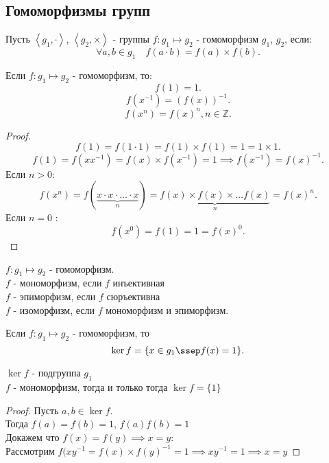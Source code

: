 \documentclass[11pt, oneside]{article}   	%
\begin{document}
    \subsection{Гомоморфизмы групп}
        \begin{definition}
            Пусть $\left<g_1, \cdot \right>$, $\left<g_2, \times \right>$ - группы
            $f: g_1 \mapsto g_2$ - гомоморфизм $g_1$, $g_2$, если:
            \[ \forall{a, b\in g_1}\quad f(a\cdot b) = f(a) \times  f(b) .\]
        \end{definition}
        \begin{dlemma}
            Если $f: g_1 \mapsto g_2$ - гомоморфизм, то:
            \[ f(1) = 1 .\]
            \[ f(x^{-1}) = (f(x))^{-1} .\]
            \[ f(x^{n}) = f(x)^{n}, n\in \mathbb{Z} .\]
            \begin{proof}
                \[ f(1) = f(1\cdot 1) = f(1) \times  f(1) = 1 = 1 \times  1 .\]
                \[ f(1) = f(x x^{-1}) = f(x)\times f(x^{-1}) = 1 \implies f(x^{-1}) = f(x)^{-1}  .\]
                Если $n>0$:
                \[ f(x^{n}) = f(\underbrace{x\cdot x\cdot \ldots \cdot x}_n) = \underbrace{f(x)\times f(x) \times  \ldots f(x)}_n = f(x)^{n} .\]
                Если $n=0$ :
                \[ f(x^{0}) = f(1) = 1 = f(x)^{0} .\] 
            \end{proof}
        \end{dlemma}
        \begin{definition}
             $f: g_1 \mapsto g_2$ - гомоморфизм.\\
             $f$ - мономорфизм, если  $f$ инъективная\\
             $f$ - эпиморфизм, если $f$ сюръективна\\
             $f$ - изоморфизм, если $f$ мономорфизм и эпиморфизм.
        \end{definition}
        \begin{definition}
            Если $f: g_1 \mapsto g_2$ - гомоморфизм, то 
            \[ \ker f = \{x\in g_1\ssep f(x) = 1\}  .\] 
        \end{definition}
        \begin{theorem}
            $\ker f$ - подгруппа $g_1$\\
            $f$ - мономорфизм, тогда и только тогда $\ker f = \{1\} $ 
            \begin{proof}
                Пусть $a, b\in \ker f$.\\
                Тогда $f(a) = f(b) = 1$,  $f(a)f(b) = 1$\\ 
                Докажем что $f(x) = f(y) \implies x=y$:\\
                Рассмотрим $f(xy^{-1} = f(x) \times f(y)^{-1} = 1 \implies xy^{-1} = 1 \implies x=y$
            \end{proof}
        \end{theorem}
\end{document}
